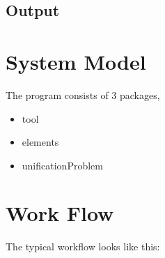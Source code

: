 \documentclass{article}
\begin{document}

\subsection{Output}

\section{System Model}
The program consists of 3 packages,
\begin{itemize}
	\item tool
	\item elements
	\item unificationProblem
\end{itemize}



\section{Work Flow}
The typical workflow looks like this:

%




%



%
\end{document}
